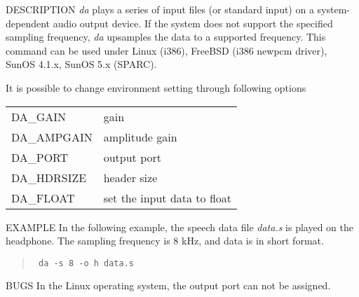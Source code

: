 \begin{qsection}{DESCRIPTION}
{\em da} plays a series of input files (or standard input) 
on a system-dependent audio output device.
If the system does not support the specified sampling frequency, 
{\em da} upsamples the data to a supported frequency.
This command can be used under
Linux (i386), FreeBSD (i386 newpcm driver), SunOS 4.1.x, SunOS 5.x (SPARC).
 
It is possible to change environment setting through following options

\begin{tabular}{ll}
DA\_GAIN & gain\\
DA\_AMPGAIN & amplitude gain\\
DA\_PORT & output port\\
DA\_HDRSIZE & header size\\
DA\_FLOAT & set the input data to float\\
\end{tabular}

\end{qsection}

\begin{options}
\end{options}

\begin{qsection}{EXAMPLE}
In the following example, the speech data file {\em data.s}
is played on the headphone.
The sampling frequency is 8 kHz, and data is in short format.
\begin{quote}
\verb! da -s 8 -o h data.s!
\end{quote}
\end{qsection}

\begin{qsection}{BUGS}
In the Linux operating system, the output port can not be assigned.
\end{qsection}

